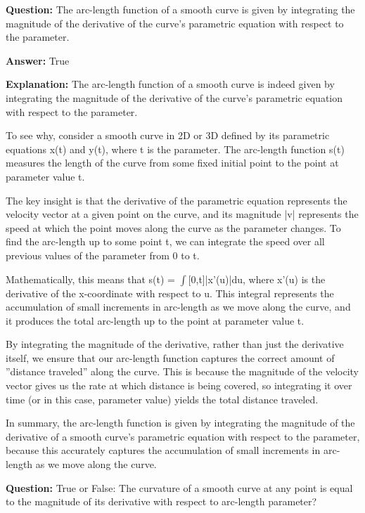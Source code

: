 \documentclass{article}
\begin{document}
            
                \textbf {Question:} The arc-length function of a smooth curve is given by integrating the magnitude of the derivative of the curve's parametric equation with respect to the parameter.
                
                \textbf{Answer:} True

                \textbf{Explanation:} The arc-length function of a smooth curve is indeed given by integrating the magnitude of the derivative of the curve's parametric equation with respect to the parameter.

To see why, consider a smooth curve in 2D or 3D defined by its parametric equations x(t) and y(t), where t is the parameter. The arc-length function s(t) measures the length of the curve from some fixed initial point to the point at parameter value t.

The key insight is that the derivative of the parametric equation represents the velocity vector at a given point on the curve, and its magnitude |v| represents the speed at which the point moves along the curve as the parameter changes. To find the arc-length up to some point t, we can integrate the speed over all previous values of the parameter from 0 to t.

Mathematically, this means that s(t) = \ensuremath{\int}[0,t]|x'(u)|du, where x'(u) is the derivative of the x-coordinate with respect to u. This integral represents the accumulation of small increments in arc-length as we move along the curve, and it produces the total arc-length up to the point at parameter value t.

By integrating the magnitude of the derivative, rather than just the derivative itself, we ensure that our arc-length function captures the correct amount of ''distance traveled'' along the curve. This is because the magnitude of the velocity vector gives us the rate at which distance is being covered, so integrating it over time (or in this case, parameter value) yields the total distance traveled.

In summary, the arc-length function is given by integrating the magnitude of the derivative of a smooth curve's parametric equation with respect to the parameter, because this accurately captures the accumulation of small increments in arc-length as we move along the curve.
                
                \vspace{0.5cm} 
        
            
                \textbf {Question:} True or False: The curvature of a smooth curve at any point is equal to the magnitude of its derivative with respect to arc-length parameter?
                
\end{document}
